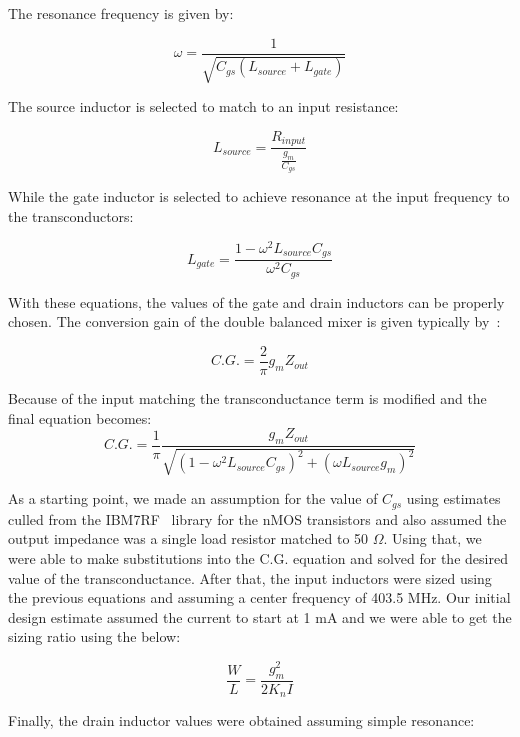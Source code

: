 The resonance frequency is given by:

\begin{equation}
\omega = \frac{1}{\sqrt{C_{gs}(L_{source}+L_{gate})}}
\end{equation}

The source inductor is selected to match to an input resistance:

\begin{equation}
L_{source} = \frac{R_{input}}{\frac{g_{m}}{C_{gs}}}
\end{equation}

While the gate inductor is selected to achieve resonance at the input frequency to the transconductors:

\begin{equation}
L_{gate}=\frac{1-\omega^{2}L_{source}C_{gs}}{\omega^{2}C_{gs}}
\end{equation}

With these equations, the values of the gate and drain inductors can be properly chosen.
The conversion gain of the double balanced mixer is given typically by~\cite{Razavi}:

\begin{equation}
C.G. = \frac{2}{\pi}g_{m}Z_{out}
\end{equation}

Because of the input matching the transconductance term is modified and the final equation becomes:
\begin{equation}
C.G. = \frac{1}{\pi}\frac{g_{m}Z_{out}}{\sqrt{(1-\omega^{2}L_{source}C_{gs})^{2}+(\omega L_{source}g_{m})^{2}}}
\end{equation}

As a starting point, we made an assumption for the value of $C_{gs}$ using estimates culled from the IBM7RF~\cite{ibm7rf} library for the nMOS transistors and also assumed the output impedance was a single load resistor matched to 50 $\Omega$. Using that, we were able to make substitutions into the C.G. equation and solved for the desired value of the transconductance. After that, the input inductors were sized using the previous equations and assuming a center frequency of 403.5 MHz. Our initial design estimate assumed the current to start at 1 mA and we were able to get the sizing ratio using the below:

\begin{equation}
\frac{W}{L} = \frac{g_{m}^2}{2K_{n}I}
\end{equation}

Finally, the drain inductor values were obtained assuming simple resonance:


